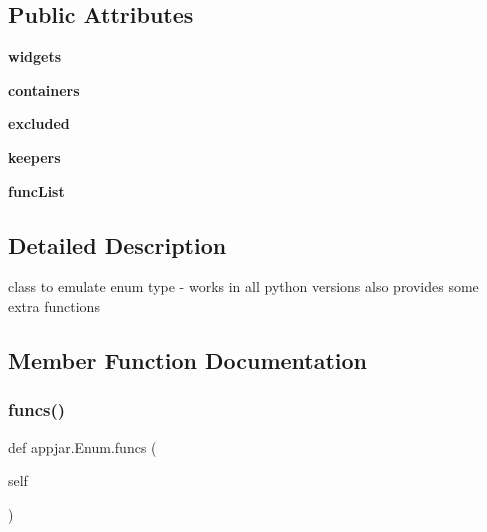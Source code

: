 \subsection*{Public Attributes}
\begin{DoxyCompactItemize}
\item 
\mbox{\label{classappjar_1_1_enum_afeee01fd53617e511323345034651f0b}} 
{\bfseries widgets}
\item 
\mbox{\label{classappjar_1_1_enum_acb87908f29b8f64858b7faecd4b00b21}} 
{\bfseries containers}
\item 
\mbox{\label{classappjar_1_1_enum_a12c76880ac83b9ff568fdf31009b38f1}} 
{\bfseries excluded}
\item 
\mbox{\label{classappjar_1_1_enum_ac09229bcd0c44d7142c63d9e0d6ddba5}} 
{\bfseries keepers}
\item 
\mbox{\label{classappjar_1_1_enum_abb7c1eeca66b90791b24885b5c245dbe}} 
{\bfseries func\+List}
\end{DoxyCompactItemize}


\subsection{Detailed Description}
\begin{DoxyVerb}class to emulate enum type - works in all python versions
    also provides some extra functions \end{DoxyVerb}
 

\subsection{Member Function Documentation}
\mbox{\label{classappjar_1_1_enum_a04d8f9175ef44a7473aabd410e31529d}} 
\subsubsection{\texorpdfstring{funcs()}{funcs()}}
{\footnotesize\ttfamily def appjar.\+Enum.\+funcs (\begin{DoxyParamCaption}\item[{}]{self }\end{DoxyParamCaption})}

